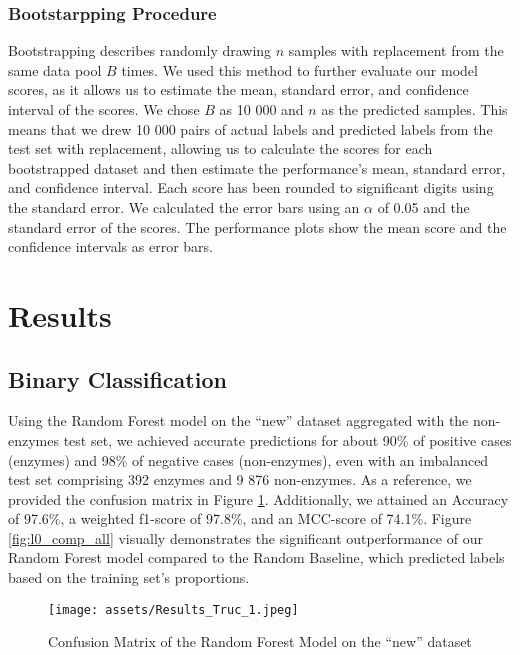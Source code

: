 \documentclass{bioinfo}
\begin{document}
\begin{methods}
\subsubsection{Bootstarpping Procedure}
Bootstrapping describes randomly drawing $n$ samples with replacement from the same data pool $B$ times.
We used this method to further evaluate our model scores, as it allows us to estimate the mean, standard error, and confidence interval of the scores.
We chose $B$ as 10 000 and $n$ as the predicted samples.
This means that we drew 10 000 pairs of actual labels and predicted labels from the test set with replacement,
allowing us to calculate the scores for each bootstrapped dataset and then estimate the performance's mean, 
standard error, and confidence interval.
Each score has been rounded to significant digits using the standard error.
We calculated the error bars using an $\alpha$ of 0.05 and the standard error of the scores.
The performance plots show the mean score and the confidence intervals as error bars.

\end{methods}

\section{Results}	

\subsection{Binary Classification}\label{sec:RF_level0}
Using the Random Forest model on the ``new'' dataset aggregated with the non-enzymes test set, we achieved accurate
predictions for about 90\% of positive cases (enzymes) and 98\% of negative
cases (non-enzymes), even with an imbalanced test set comprising 392
enzymes and 9 876 non-enzymes. As a reference, we provided the confusion
matrix in Figure \ref{fig:RF_conf_l0}.
Additionally, we attained an Accuracy of 97.6\%, a weighted f1-score of
97.8\%, and an MCC-score of 74.1\%. Figure \ref{fig:l0_comp_all} visually demonstrates the significant outperformance of our Random Forest model 
compared to the Random Baseline, which predicted labels based on the training set's proportions.

\begin{figure}[!hb]
\texttt{[image: assets/Results\_Truc\_1.jpeg]}
\caption{Confusion Matrix of the Random Forest Model on the “new” dataset}\label{fig:RF_conf_l0}
\end{figure}
\end{document}
